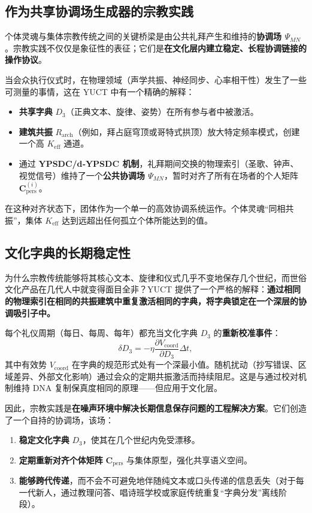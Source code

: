 \documentclass[12pt,a4paper]{article}
\begin{document}
	\subsection{作为共享协调场生成器的宗教实践}
	
	个体灵魂与集体宗教传统之间的关键桥梁是由公共礼拜产生和维持的\textbf{协调场 \(\Psi_{MN}\)}。宗教实践不仅仅是象征性的表征；它们是\textbf{在文化层内建立稳定、长程协调链接的操作协议}。
	
	当会众执行仪式时，在物理领域（声学共振、神经同步、心率相干性）发生了一些可测量的事情，这在 YUCT 中有一个精确的解释：
	\begin{itemize}
		\item \textbf{共享字典} \(D_3\)（正典文本、旋律、姿势）在所有参与者中被激活。
		\item \textbf{建筑共振} \(R_{\mathrm{arch}}\)（例如，拜占庭穹顶或哥特式拱顶）放大特定频率模式，创建一个高 \(K_{\mathrm{eff}}\) 通道。
		\item 通过 \textbf{YPSDC/d‑YPSDC 机制}，礼拜期间交换的物理索引（圣歌、钟声、视觉信号）维持了一个\textbf{公共协调场 \(\Psi_{MN}\)}，暂时对齐了所有在场者的个人矩阵 \(\mathbf{C}_{\text{pers}}^{(i)}\)。
	\end{itemize}
	
	在这种对齐状态下，团体作为一个单一的高效协调系统运作。个体灵魂“同相共振”，集体 \(K_{\mathrm{eff}}\) 达到远超出任何孤立个体所能达到的值。
	
	\subsection{文化字典的长期稳定性}
	
	为什么宗教传统能够将其核心文本、旋律和仪式几乎不变地保存几个世纪，而世俗文化产品在几代人中就变得面目全非？YUCT 提供了一个严格的解释：\textbf{通过相同的物理索引在相同的共振建筑中重复激活相同的字典，将字典锁定在一个深层的协调吸引子中。}
	
	每个礼仪周期（每日、每周、每年）都充当文化字典 \(D_3\) 的\textbf{重新校准事件}：
	\begin{equation}
		\delta D_3 = -\eta \frac{\partial V_{\text{coord}}}{\partial D_3} \Delta t,
	\end{equation}
	其中有效势 \(V_{\text{coord}}\) 在字典的规范形式处有一个深最小值。随机扰动（抄写错误、区域差异、外部文化影响）通过会众的定期共振激活而持续阻尼。这是与通过校对机制维持 DNA 复制保真度相同的原理——但应用于文化层。
	
	因此，宗教实践是\textbf{在噪声环境中解决长期信息保存问题的工程解决方案}。它们创造了一个自持的协调场，该场：
	\begin{enumerate}
		\item \textbf{稳定文化字典} \(D_3\)，使其在几个世纪内免受漂移。
		\item \textbf{定期重新对齐个体矩阵} \(\mathbf{C}_{\text{pers}}\) 与集体原型，强化共享语义空间。
		\item \textbf{能够跨代传递}，而不会不可避免地伴随纯文本或口头传递的信息丢失（对于每一代新人，通过教理问答、唱诗班学校或家庭传统重复“字典分发”离线阶段）。
	\end{enumerate}
	
\end{document}
